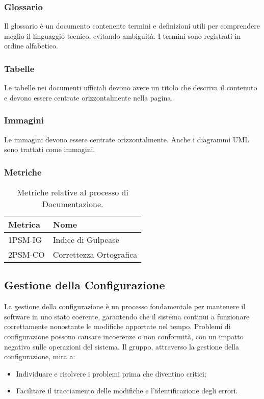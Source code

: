 \subsubsection{Glossario}
Il glossario è un documento contenente termini e definizioni utili per comprendere meglio il linguaggio tecnico, evitando ambiguità. 
I termini sono registrati in ordine alfabetico.


\subsubsection{Tabelle}
Le tabelle nei documenti ufficiali devono avere un titolo che descriva il contenuto e devono essere centrate orizzontalmente nella pagina.

\subsubsection{Immagini}
Le immagini devono essere centrate orizzontalmente. Anche i diagrammi UML sono trattati come immagini.

\subsubsection{Metriche}
\begin{table}[h!]
    \centering
    \renewcommand{\arraystretch}{1.5}
    \begin{tabular}{|l|l|}
        \hline
        \textbf{Metrica} & \textbf{Nome} \\
        \hline
        1PSM-IG & Indice di Gulpease \\
        \hline
        2PSM-CO & Correttezza Ortografica \\
        \hline
    \end{tabular}
    \caption{Metriche relative al processo di Documentazione.}
\end{table}









\subsection{Gestione della Configurazione}
La gestione della configurazione è un processo fondamentale per mantenere il software in uno stato coerente, 
garantendo che il sistema continui a funzionare correttamente nonostante le modifiche apportate nel tempo.
Problemi di configurazione possono causare incoerenze o non conformità, con un impatto negativo sulle operazioni del sistema.
Il gruppo, attraverso la gestione della configurazione, mira a:
\begin{itemize}
    \item Individuare e risolvere i problemi prima che diventino critici;
    \item Facilitare il tracciamento delle modifiche e l’identificazione degli errori.
\end{itemize}

